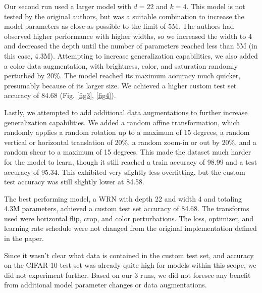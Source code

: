 \documentclass[letterpaper]{article} %
\begin{document}
Our second run used a larger model with $d=22$ and $k=4$.  This model is not tested by the original authors, but was a suitable combination to increase the model parameters as close as possible to the limit of 5M.  The authors had observed higher performance with higher widths, so we increased the width to 4 and decreased the depth until the number of parameters reached less than 5M (in this case, 4.3M).  Attempting to increase generalization capabilities, we also added a color data augmentation, with brightness, color, and saturation randomly perturbed by 20\%.  The model reached its maximum accuracy much quicker, presumably because of its larger size.  We achieved a higher custom test set accuracy of 84.68 (Fig. \ref{fig3}, \ref{fig4}).

Lastly, we attempted to add additional data augmentations to further increase generalization capabilities.  We added a random affine transformation, which randomly applies a random rotation up to a maximum of 15 degrees, a random vertical or horizontal translation of 20\%, a random zoom-in or out by 20\%, and a random shear to a maximum of 15 degrees.  This made the dataset much harder for the model to learn, though it still reached a train accuracy of 98.99 and a test accuracy of 95.34.  This exhibited very slightly less overfitting, but the custom test accuracy was still slightly lower at 84.58.

The best performing model, a WRN with depth 22 and width 4 and totaling 4.3M parameters, achieved a custom test set accuracy of 84.68.  The transforms used were horizontal flip, crop, and color perturbations.  The loss, optimizer, and learning rate schedule were not changed from the original implementation defined in the paper.

Since it wasn't clear what data is contained in the custom test set, and accuracy on the CIFAR-10 test set was already quite high for models within this scope, we did not experiment further.  Based on our 3 runs, we did not foresee any benefit from additional model parameter changes or data augmentations.
\end{document}
